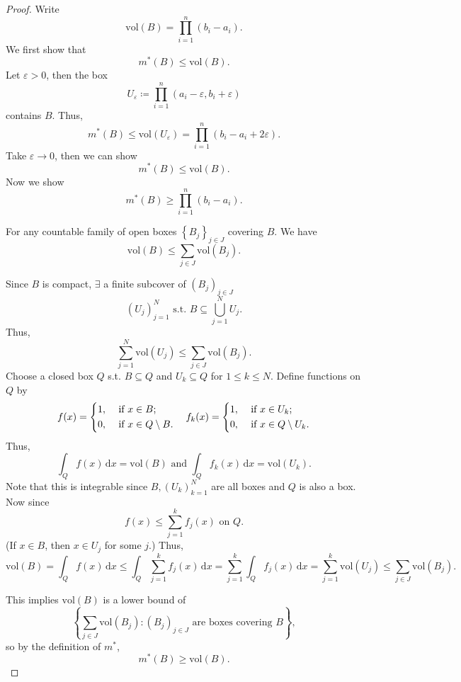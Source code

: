 \begin{proof}
    Write 
    \[
        \mathrm{vol} (B) = \prod _{i=1}^n (b_i - a_i). 
    \]
    We first show that 
    \[
        m^* (B) \le \mathrm{vol}(B). 
    \]
    Let \(\varepsilon > 0\), then the box 
    \[
        U_{\varepsilon } \coloneqq \prod _{i=1}^n (a_i - \varepsilon, b_i + \varepsilon) 
    \] 
    contains \(B\). Thus,
    \[
        m^* (B) \le \mathrm{vol}(U_{\varepsilon} ) = \prod _{i=1}^n (b_i - a_i + 2\varepsilon ). 
    \] 
    Take \(\varepsilon \to 0\), then we can show 
    \[
        m^* (B) \le \mathrm{vol} (B). 
    \] 
    Now we show 
    \[
        m^* (B) \ge \prod _{i=1}^n (b_i - a_i).
    \]
    \begin{claim}
        For any countable family of open boxes \(\left\{ B_j \right\}_{j \in J} \) covering \(B\). We have
        \[
            \mathrm{vol} (B) \le \sum_{j \in J} \mathrm{vol}(B_j).
        \]   
    \end{claim}

    \begin{explanation}
        Since \(B\) is compact, \(\exists \) a finite subcover of \((B_j)_{j \in J}\)
        \[
            \left( U_j \right)_{j=1}^N \text{ s.t. } B \subseteq \bigcup_{j=1}^{N} U_j.    
        \]
        Thus,
        \[
            \sum_{j=1}^N \mathrm{vol} (U_j) \le \sum_{j \in J} \mathrm{vol} (B_j).    
        \]
        Choose a closed box \(Q\) s.t. \(B \subseteq Q\) and \(U_k \subseteq Q\) for \(1 \le k \le N\). Define functions on \(Q\) by 
        \[
            f(x) = \begin{dcases}
                1, &\text{ if } x \in B ;\\
                0, &\text{ if } x \in Q \setminus B.
            \end{dcases} \quad f_k(x) = \begin{dcases}
                1, &\text{ if } x \in U_k ;\\
                0, &\text{ if } x \in Q \setminus U_k .
            \end{dcases}
        \]  
        Thus,
        \[
            \int _Q f(x) \,\mathrm{d} x = \mathrm{vol} (B) \text{ and } \int _Q f_k(x) \, \mathrm{d} x = \mathrm{vol} (U_k).     
        \]
        Note that this is integrable since \(B, \left( U_k \right)_{k=1}^N \) are all boxes and \(Q\) is also a box. 
        Now since 
        \[
            f(x) \le \sum_{j=1}^k f_j(x) \text{ on } Q.
        \] 
        (If \(x \in B\), then \(x \in U_j\) for some \(j\).)   
        Thus,
        \[
            \mathrm{vol}(B) = \int _Q f(x) \, \mathrm{d} x \le \int_Q \sum_{j=1}^k f_j (x) \, \mathrm{d} x = \sum_{j=1}^k \int_Q f_j (x) \, \mathrm{d} x = \sum_{j=1}^k \mathrm{vol} (U_j) \le \sum_{j \in J} \mathrm{vol} (B_j) .     
        \]
    \end{explanation}

    This implies \(\mathrm{vol} (B) \) is a lower bound of 
    \[
        \left\{ \sum_{j \in J} \mathrm{vol}(B_j) : (B_j)_{j \in J} \text{ are boxes covering } B    \right\}, 
    \] 
    so by the definition of \(m^*\),
    \[
        m^* (B) \ge \mathrm{vol} (B). 
    \] 
\end{proof}